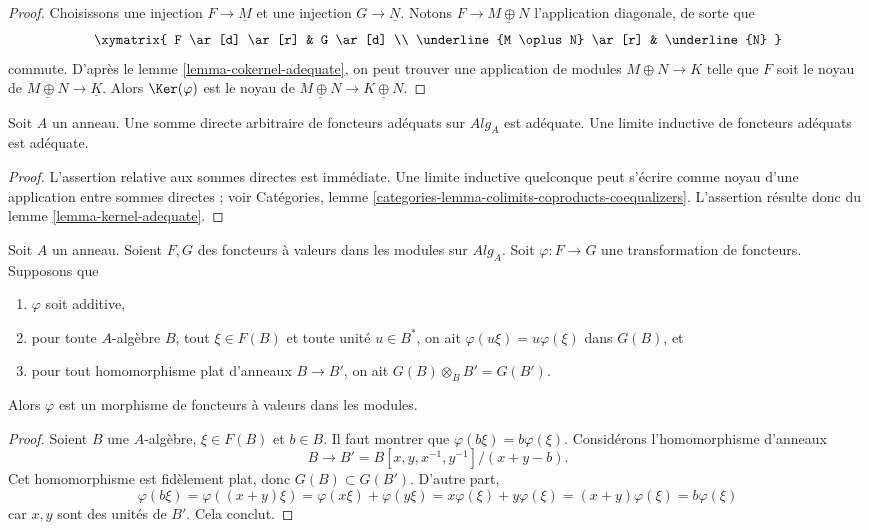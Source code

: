 \begin{proof}
Choisissons une injection $F \to \underline{M}$ et une injection
$G \to \underline{N}$. Notons $F \to \underline{M \oplus N}$
l'application diagonale, de sorte que
$$
\xymatrix{
F \ar[d] \ar[r] & G \ar[d] \\
\underline{M \oplus N} \ar[r] & \underline{N}
}
$$
commute. D'après le
lemme \ref{lemma-cokernel-adequate},
on peut trouver une application de modules $M \oplus N \to K$ telle que
$F$ soit le noyau de $\underline{M \oplus N} \to \underline{K}$.
Alors $\Ker(\varphi)$ est le noyau de
$\underline{M \oplus N} \to \underline{K \oplus N}$.
\end{proof}

\begin{lemma}
\label{lemma-colimit-adequate}
Soit $A$ un anneau.
Une somme directe arbitraire de foncteurs adéquats sur $\textit{Alg}_A$
est adéquate. Une limite inductive de foncteurs adéquats est adéquate.
\end{lemma}

\begin{proof}
L'assertion relative aux sommes directes est immédiate.
Une limite inductive quelconque peut s'écrire comme noyau d'une application entre
sommes directes ; voir
Catégories, lemme \ref{categories-lemma-colimits-coproducts-coequalizers}.
L'assertion résulte donc du
lemme \ref{lemma-kernel-adequate}.
\end{proof}

\begin{lemma}
\label{lemma-flat-linear-functor}
Soit $A$ un anneau.
Soient $F, G$ des foncteurs à valeurs dans les modules sur $\textit{Alg}_A$.
Soit $\varphi : F \to G$ une transformation de foncteurs. Supposons que
\begin{enumerate}
\item $\varphi$ soit additive,
\item pour toute $A$-algèbre $B$, tout $\xi \in F(B)$ et toute unité
$u \in B^*$, on ait $\varphi(u\xi) = u\varphi(\xi)$ dans $G(B)$, et
\item pour tout homomorphisme plat d'anneaux $B \to B'$, on ait
$G(B) \otimes_B B' = G(B')$.
\end{enumerate}
Alors $\varphi$ est un morphisme de foncteurs à valeurs dans les modules.
\end{lemma}

\begin{proof}
Soient $B$ une $A$-algèbre, $\xi \in F(B)$ et $b \in B$. Il faut montrer
que $\varphi(b \xi) = b \varphi(\xi)$. Considérons l'homomorphisme d'anneaux
$$
B \to B' = B[x, y, x^{-1}, y^{-1}]/(x + y - b).
$$
Cet homomorphisme est fidèlement plat, donc $G(B) \subset G(B')$. D'autre
part,
$$
\varphi(b\xi) = \varphi((x + y)\xi) =
\varphi(x\xi) + \varphi(y\xi) = x\varphi(\xi) + y\varphi(\xi)
= (x + y)\varphi(\xi) = b\varphi(\xi)
$$
car $x, y$ sont des unités de $B'$. Cela conclut.
\end{proof}

